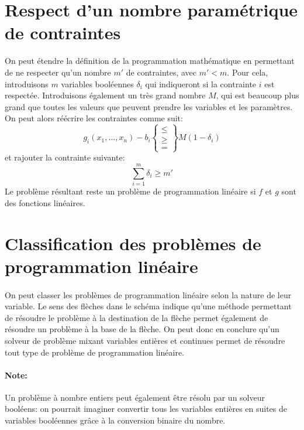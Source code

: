 \documentclass[a4paper]{report}
\begin{document}
\section{Respect d'un nombre paramétrique de contraintes}
On peut étendre la définition de la programmation mathématique en permettant
de ne respecter qu'un nombre \(m'\) de contraintes, avec \(m'<m\).
Pour cela, introduisons \(m\) variables booléennes \(\delta_i\) qui indiqueront
si la contrainte \(i\) est respectée. Introduisons également un très grand nombre \(M\),
qui est beaucoup plus grand que toutes les valeurs que peuvent prendre les variables
et les paramètres. On peut alors réécrire les contraintes comme suit:
\[g_i(x_1,\dots,x_n)-b_i\begin{Bmatrix}\le\\\ge\\=\end{Bmatrix}M(1-\delta_i)\]
et rajouter la contrainte suivante:
\[\sum_{i=1}^{m}\delta_i\ge m'\]
Le problème résultant reste un problème de programmation linéaire si \(f\) et
\(g\) sont des fonctions linéaires.
\section{Classification des problèmes de programmation linéaire}
\paragraph{}On peut classer les problèmes de programmation linéaire selon la nature de leur variable. Le sens des flèches dans le schéma indique qu'une méthode permettant de résoudre le problème à la destination de la flèche permet également de résoudre un problème à la base de la flèche. On peut donc en conclure qu'un solveur de problème mixant variables entières et continues permet de résoudre tout type de problème de programmation linéaire.
\paragraph{Note:}Un problème à nombre entiers peut également être résolu par un solveur booléens: on pourrait imaginer convertir tous les variables entières en suites de variables booléennes grâce à la conversion binaire du nombre.
\end{document}
